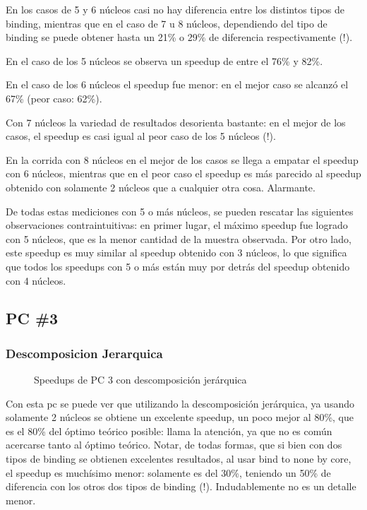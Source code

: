 \documentclass{article}
\begin{document}
En los casos de 5 y 6 núcleos casi no hay diferencia entre los distintos tipos de binding, mientras que en el caso de 7 u 8 núcleos, dependiendo del tipo de binding se puede obtener hasta un 21\% o 29\% de diferencia respectivamente (!).

En el caso de los 5 núcleos se observa un speedup de entre el 76\% y 82\%. 

En el caso de los 6 núcleos el speedup fue menor: en el mejor caso se alcanzó el 67\% (peor caso: 62\%). 

Con 7 núcleos la variedad de resultados desorienta bastante: en el mejor de los casos, el speedup es casi igual al peor caso de los 5 núcleos (!).

En la corrida con 8 núcleos en el mejor de los casos se llega a empatar el speedup con 6 núcleos, mientras que en el peor caso el speedup es más parecido al speedup obtenido con solamente 2 núcleos que a cualquier otra cosa. Alarmante.

De todas estas mediciones con 5 o más núcleos, se pueden rescatar las siguientes observaciones contraintuitivas: en primer lugar, el máximo speedup fue logrado con 5 núcleos, que es la menor cantidad de la muestra observada. Por otro lado, este speedup es muy similar al speedup obtenido con 3 núcleos, lo que significa que todos los speedups con 5 o más están muy por detrás del speedup obtenido con 4 núcleos.

\subsection{PC \#3}
\subsubsection{Descomposicion Jerarquica}
\begin{figure}[H]
    
    \caption{Speedups de PC 3 con descomposición jerárquica}
\end{figure}

Con esta pc se puede ver que utilizando la descomposición jerárquica, ya usando solamente 2 núcleos se obtiene un excelente speedup, un poco mejor al 80\%, que es el 80\% del óptimo teórico posible: llama la atención, ya que no es común acercarse tanto al óptimo teórico. Notar, de todas formas, que si bien con dos tipos de binding se obtienen excelentes resultados, al usar bind to none by core, el speedup es muchísimo menor: solamente es del 30\%, teniendo un 50\% de diferencia con los otros dos tipos de binding (!). Indudablemente no es un detalle menor.
\end{document}

